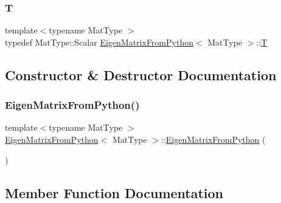 \subsubsection{\texorpdfstring{T}{T}}
{\footnotesize\ttfamily template$<$typename Mat\+Type $>$ \\
typedef Mat\+Type\+::\+Scalar \hyperlink{structEigenMatrixFromPython}{Eigen\+Matrix\+From\+Python}$<$ Mat\+Type $>$\+::\hyperlink{structEigenMatrixFromPython_a8885900b36ff931d90b9d2b572c6edb1}{T}}



\subsection{Constructor \& Destructor Documentation}
\mbox{\label{structEigenMatrixFromPython_a86d49b77f8df143e48855b2b4c7371ad}} 
\subsubsection{\texorpdfstring{Eigen\+Matrix\+From\+Python()}{EigenMatrixFromPython()}}
{\footnotesize\ttfamily template$<$typename Mat\+Type $>$ \\
\hyperlink{structEigenMatrixFromPython}{Eigen\+Matrix\+From\+Python}$<$ Mat\+Type $>$\+::\hyperlink{structEigenMatrixFromPython}{Eigen\+Matrix\+From\+Python} (\begin{DoxyParamCaption}{ }\end{DoxyParamCaption})\hspace{0.3cm}{\ttfamily [inline]}}



\subsection{Member Function Documentation}
\mbox{\label{structEigenMatrixFromPython_ab0fa3bbc6332e98fee9f5c26476d0fa0}} 
